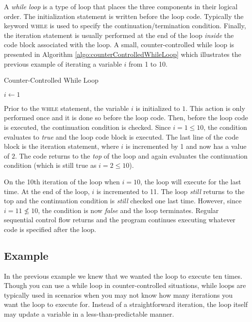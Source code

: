 A \emph{while loop} is a type of loop that places the three components in their 
logical order.  The initialization statement is written before the loop code.  
Typically the keyword \textsc{while} is used to specify the continuation/termination
condition.  Finally, the iteration statement is usually performed at the end of the loop
\emph{inside} the code block associated with the loop.  A small, counter-controlled 
while loop is presented in Algorithm \ref{algo:counterControlledWhileLoop} which 
illustrates the previous example of iterating a variable $i$ from 1 to 10.

\begin{algorithm}[H]
\caption{Counter-Controlled While Loop}
\label{algo:counterControlledWhileLoop}
$i \leftarrow 1$ 
\end{algorithm}

Prior to the \textsc{while} statement, the variable $i$ is initialized to $1$.  This action
is only performed once and it is done so before the loop code.  Then, before the loop
code is executed, the continuation condition is checked.  Since $i = 1 \leq 10$, the 
condition evaluates to \emph{true} and the loop code block is executed.  The last
line of the code block is the iteration statement, where $i$ is incremented by 1 and
now has a value of $2$.  The code returns to the \emph{top} of the loop and again
evaluates the continuation condition (which is still true as $i = 2 \leq 10$).  

On the 10th iteration of the loop when $i = 10$, the loop will execute for the last
time.  At the end of the loop, $i$ is incremented to 11.  The loop \emph{still} returns
to the top and the continuation condition is \emph{still} checked one last time.  However,
since $i = 11 \not\leq 10$, the condition is now \emph{false} and the loop terminates.
Regular sequential control flow returns and the program continues executing whatever
code is specified after the loop.

\subsection{Example}
\label{subsection:whileLoopExample}

In the previous example we knew that we wanted the loop to execute ten
times.  Though you can use a while loop in counter-controlled situations, while loops are 
typically used in scenarios when you may not know how many iterations you want 
the loop to execute for.  Instead of a straightforward iteration, the loop itself may
update a variable in a less-than-predictable manner.  

